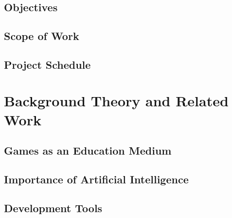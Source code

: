 \documentclass[12pt,oneside,openright,a4paper]{explo-english-project}
\begin{document}
\section{Objectives}


\section{Scope of Work}


\section{Project Schedule}




\chapter{Background Theory and Related Work}

\section{Games as an Education Medium}


\section{Importance of Artificial Intelligence}


\section{Development Tools}




\end{document}
